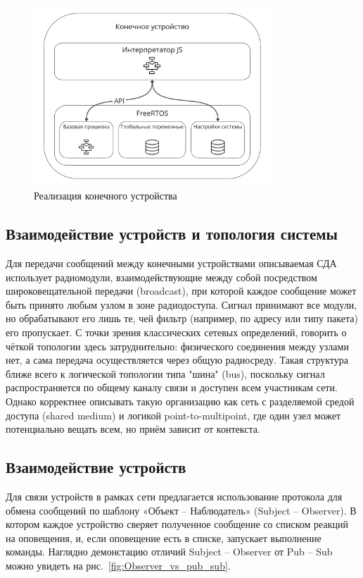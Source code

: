 \documentclass[a4paper,12pt]{article}
\begin{document}
\begin{figure}[H]
    \centering
    \includegraphics[width=0.8\textwidth]{images/Fig05.png}
    \caption{Реализация конечного устройства}
    \label{fig:end_device}
\end{figure}

\subsection{Взаимодействие устройств и топология системы}

Для передачи сообщений между конечными устройствами описываемая СДА использует радиомодули, взаимодействующие между собой посредством широковещательной передачи (broadcast), при которой каждое сообщение может быть принято любым узлом в зоне радиодоступа. Сигнал принимают все модули, но обрабатывают его лишь те, чей фильтр (например, по адресу или типу пакета) его пропускает. С точки зрения классических сетевых определений, говорить о чёткой топологии здесь затруднительно: физического соединения между узлами нет, а сама передача осуществляется через общую радиосреду. Такая структура ближе всего к логической топологии типа "шина" (bus), поскольку сигнал распространяется по общему каналу связи и доступен всем участникам сети. Однако корректнее описывать такую организацию как сеть с разделяемой средой доступа (shared medium) и логикой point-to-multipoint, где один узел может потенциально вещать всем, но приём зависит от контекста.

\subsection{Взаимодействие устройств}
Для связи устройств в рамках сети предлагается использование протокола для обмена сообщений по шаблону «Объект -- Наблюдатель» (Subject -- Observer). В котором каждое устройство сверяет полученное сообщение со списком реакций на оповещения, и, если оповещение есть в списке, запускает выполнение команды. Наглядно демонстацию отличий Subject -- Observer от Pub -- Sub можно увидеть на рис.~\ref{fig:Observer_vs_pub_sub}.
\end{document}

